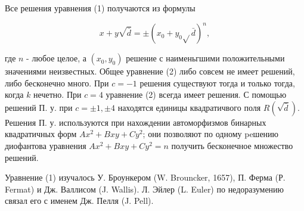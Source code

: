 \documentclass[10pt]{article}
\begin{document}
Все решения уравнения (1) получаются из формулы



\[

x+y \sqrt{\bar{d}}= \pm\left(x_{0}+y_{0} \sqrt{ } \bar{d}\right)^{n},

\]



где $n$ - любое целое, а $\left(x_{0}, y_{0}\right)$ решение с наименьгшими положительными значениями неизвестных. Общее уравнение (2) либо совсем не имеет решений, либо бесконечно много. При $c=-1$ решения существуют тогда и только тогда, когда $k$ нечетно. При $c=4$ уравнение (2) всегда имеет решения. С помощью решений П. у. при $c= \pm 1, \pm 4$ находятся единицы квадратичвого поля $R(\sqrt{\bar{d}})$. Решения П. у. используются при нахождении автоморфизмов бинарных квадратичных форм $A x^{2}+B x y+C y^{2}$; они позволяют по одному peшению диофантова уравнения $A x^{2}+B x y+C y^{2}=n$ получить бесконечное множество решений.



Уравнение (1) изучалось У. Броункером (W. Brouncker, 1657), П. Ферма (Р. Fermat) и Дж. Валлисом (J. Wallis). Л. Эйлер (L. Euler) по недоразумению связал его с именем Дж. Пелля (J. Pell).
\end{document}
